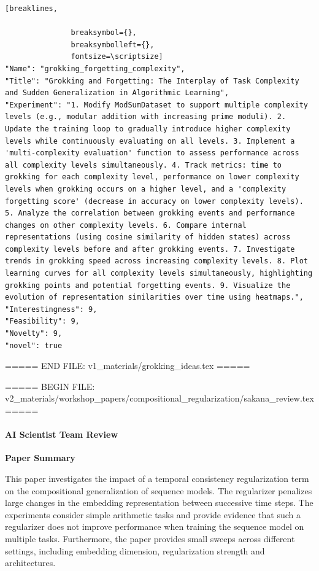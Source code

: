 \begin{tcolorbox}[
  breakable,
  colback  = blue!5!white,
  colframe = blue!75!black,
  title    = {Idea 50/50 - \texttt{grokking\_forgetting\_complexity}},
  fontupper=\scriptsize\ttfamily,
]
\begin{Verbatim}[breaklines,

               breaksymbol={},
               breaksymbolleft={},
               fontsize=\scriptsize]
"Name": "grokking_forgetting_complexity",
"Title": "Grokking and Forgetting: The Interplay of Task Complexity and Sudden Generalization in Algorithmic Learning",
"Experiment": "1. Modify ModSumDataset to support multiple complexity levels (e.g., modular addition with increasing prime moduli). 2. Update the training loop to gradually introduce higher complexity levels while continuously evaluating on all levels. 3. Implement a 'multi-complexity evaluation' function to assess performance across all complexity levels simultaneously. 4. Track metrics: time to grokking for each complexity level, performance on lower complexity levels when grokking occurs on a higher level, and a 'complexity forgetting score' (decrease in accuracy on lower complexity levels). 5. Analyze the correlation between grokking events and performance changes on other complexity levels. 6. Compare internal representations (using cosine similarity of hidden states) across complexity levels before and after grokking events. 7. Investigate trends in grokking speed across increasing complexity levels. 8. Plot learning curves for all complexity levels simultaneously, highlighting grokking points and potential forgetting events. 9. Visualize the evolution of representation similarities over time using heatmaps.",
"Interestingness": 9,
"Feasibility": 9,
"Novelty": 9,
"novel": true
\end{Verbatim}
\end{tcolorbox}
===== END FILE: v1_materials/grokking_ideas.tex =====

===== BEGIN FILE: v2_materials/workshop_papers/compositional_regularization/sakana_review.tex =====
\paragraph{AI Scientist Team Review}

\textbf{Paper Summary}

This paper investigates the impact of a temporal consistency regularization term on the compositional generalization of sequence models. The regularizer penalizes large changes in the embedding representation between successive time steps. The experiments consider simple arithmetic tasks and provide evidence that such a regularizer does not improve performance when training the sequence model on multiple tasks. Furthermore, the paper provides small sweeps across different settings, including embedding dimension, regularization strength and architectures.


